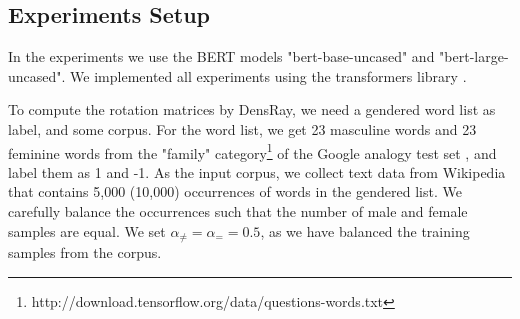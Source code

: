 \subsection{Experiments Setup}
In the experiments we use the BERT models "bert-base-uncased" and "bert-large-uncased". We implemented all experiments using the transformers library \citep{wolf2019huggingfaces}.

To compute the rotation matrices by DensRay, we need a gendered word list as label, and some corpus. For the word list, we get 23 masculine words and 23 feminine words from the "family" category\footnote{http://download.tensorflow.org/data/questions-words.txt} of the Google analogy test set \citep{mikolov2013efficient}, and label them as 1 and -1. As the input corpus, we collect text data from Wikipedia that contains 5,000 (10,000) occurrences of words in the gendered list. We carefully balance the occurrences such that the number of male and female samples are equal. We set  $\alpha_{\neq}=\alpha_{=}=0.5$, as we have balanced the training samples from the corpus.

